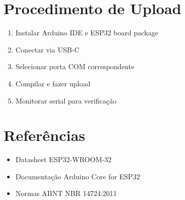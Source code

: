 \documentclass[12pt,a4paper]{article}
\begin{document}
\section{Procedimento de Upload}
\begin{enumerate}
\item Instalar Arduino IDE e ESP32 board package
\item Conectar via USB-C
\item Selecionar porta COM correspondente
\item Compilar e fazer upload
\item Monitorar serial para verificação
\end{enumerate}

\section{Referências}
\begin{itemize}
\item Datasheet ESP32-WROOM-32
\item Documentação Arduino Core for ESP32
\item Normas ABNT NBR 14724:2011
\end{itemize}
\end{document}
